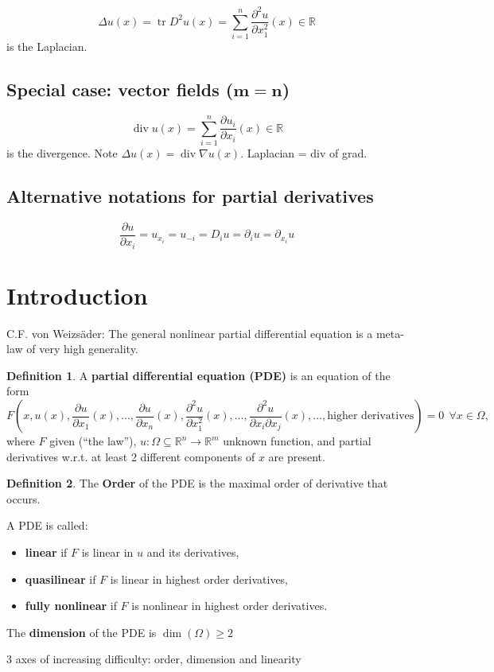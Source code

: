 \documentclass[12pt]{article}
\DeclareMathOperator{\tr}{tr}
\DeclareMathOperator{\diver}{div}
\theoremstyle{definition}
\newtheorem*{definition*}{Definition}
\begin{document}
\[\Delta u(x)=\tr D^2u(x)=\sum_{i=1}^n\frac{\partial^2u}{\partial x_1^2}(x)\in\mathbb R\]
is the Laplacian.

\subsection*{Special case: vector fields ($\boldsymbol{m=n}$)}
\[\diver u(x)=\sum_{i=1}^n\frac{\partial u_i}{\partial x_i}(x)\in\mathbb R\]
is the divergence. Note $\Delta u(x)=\diver\nabla u(x)$. Laplacian = div of grad.

\subsection*{Alternative notations for partial derivatives}
\[\frac{\partial u}{\partial x_i}=u_{x_i}=u_{-i}=D_iu=\partial_iu=\partial_{x_i}u\]

\renewcommand{\thesection}{\Roman{section}}
\section{Introduction}
C.F. von Weizs\"ader: The general nonlinear partial differential equation is a meta-law of very high generality.

\begin{definition*}
A \textbf{partial differential equation (PDE)} is an equation of the form
\[F\left(x,u(x),\frac{\partial u}{\partial x_1}(x),\ldots,\frac{\partial u}{\partial x_n}(x),\frac{\partial^2u}{\partial x_1^2}(x),\ldots,\frac{\partial^2u}{\partial x_i\partial x_j}(x),\ldots,\text{higher derivatives}\right)=0\ \ \forall x\in\Omega,\]
where $F$ given (``the law''), $u:\Omega\subseteq\mathbb R^n\rightarrow\mathbb R^m$ unknown function, and partial derivatives w.r.t. at least 2 different components of $x$ are present.
\end{definition*}

\begin{definition*}
The \textbf{Order} of the PDE is the maximal order of derivative that occurs.

A PDE is called:
\begin{itemize}
\item \textbf{linear} if $F$ is linear in $u$ and its derivatives,
\item \textbf{quasilinear} if $F$ is linear in highest order derivatives,
\item \textbf{fully nonlinear} if $F$ is nonlinear in highest order derivatives.
\end{itemize}

The \textbf{dimension} of the PDE is $\dim(\Omega)\geq2$
\end{definition*}
3 axes of increasing difficulty: order, dimension and linearity
\end{document}
